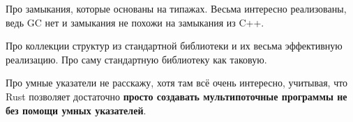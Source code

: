 \begin{frame}{\insertsubsection}
{  }

   {

    Про замыкания, которые основаны на типажах. Весьма интересно реализованы,
    ведь GC нет и замыкания не похожи на замыкания из C++.

  }

   {

    Про коллекции структур из стандартной библиотеки и их весьма эффективную
    реализацию. Про саму стандартную библиотеку как таковую.

    Про умные указатели не расскажу, хотя там всё очень интересно, учитывая, что
    Rust позволяет достаточно \textbf{просто создавать мультипоточные программы
      не без помощи умных указателей}.

  }


\end{frame}

